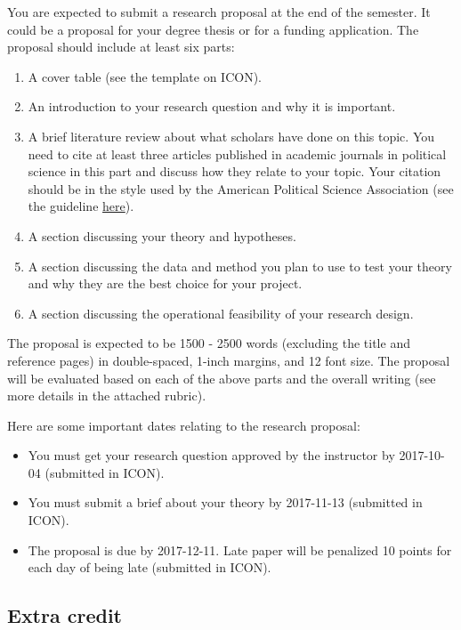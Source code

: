\documentclass[11pt,]{article}
\providecommand{\tightlist}{%
  \setlength{\itemsep}{0pt}\setlength{\parskip}{0pt}}
\theoremstyle{definition}
\theoremstyle{definition}
\theoremstyle{remark}
\begin{document}
You are expected to submit a research proposal at the end of the
semester. It could be a proposal for your degree thesis or for a funding
application. The proposal should include at least six parts:

\begin{enumerate}
\def\labelenumi{\arabic{enumi}.}
\tightlist
\item
  A cover table (see the template on ICON).
\item
  An introduction to your research question and why it is important.
\item
  A brief literature review about what scholars have done on this topic.
  You need to cite at least three articles published in academic
  journals in political science in this part and discuss how they relate
  to your topic. Your citation should be in the style used by the
  American Political Science Association (see the guideline
  \href{http://www.apsanet.org/portals/54/Files/Publications/APSAStyleManual2006.pdf}{here}).
\item
  A section discussing your theory and hypotheses.
\item
  A section discussing the data and method you plan to use to test your
  theory and why they are the best choice for your project.
\item
  A section discussing the operational feasibility of your research
  design.
\end{enumerate}

The proposal is expected to be 1500 - 2500 words (excluding the title
and reference pages) in double-spaced, 1-inch margins, and 12 font size.
The proposal will be evaluated based on each of the above parts and the
overall writing (see more details in the attached rubric).

Here are some important dates relating to the research proposal:

\begin{itemize}
\tightlist
\item
  You must get your research question approved by the instructor by
  2017-10-04 (submitted in ICON).
\item
  You must submit a brief about your theory by 2017-11-13 (submitted in
  ICON).
\item
  The proposal is due by 2017-12-11. Late paper will be penalized 10
  points for each day of being late (submitted in ICON).
\end{itemize}

\subsection{Extra credit}\label{extra-credit}
\end{document}
